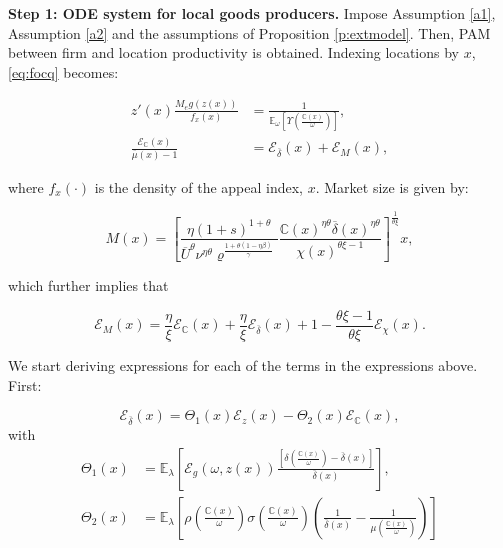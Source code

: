 \textbf{Step 1: ODE system for local goods producers.} Impose Assumption \ref{a1}, Assumption \ref{a2} and the assumptions of Proposition \ref{p:extmodel}. Then, PAM between firm and location productivity is obtained. Indexing locations by $x$, \eqref{eq:focq} becomes:

\begin{align}
	z'(x) \frac{M_e g(z(x))}{f_{x}(x)} & = \frac{1}{\mathbb{E}_{\omega}\left[\Upsilon\left(\frac{{\mathbb{C}(x)}}{\omega}\right) \right]}, \label{eq:focqx}  \\ 
    \frac{\mathcal{E}_\mathbb{C}(x)}{\overline{\mu}(x) - 1} & = \mathcal{E}_{\overline{\delta}}(x) +  \mathcal{E}_{M}(x), \label{eq:locfocx}
\end{align}

where $f_x(\cdot)$ is the density of the appeal index, $x$. Market size is given by:

\begin{equation*}
	M(x) = \left[\frac{\eta (1+s)^{1+\theta}}{\overline{U}^\theta {\nu}^{\eta \theta} \varrho^{\frac{1+\theta(1-\eta \beta)}{\gamma}}} \frac{{\mathbb{C}(x)}^{\eta \theta} \overline{\delta} \left(x\right)^{\eta \theta} }{ \chi\left(x\right)^{\theta\xi - 1}} \right]^{\frac{1}{\theta\xi}} x,
\end{equation*}

which further implies that

\begin{equation*}
	\mathcal{E}_{M}(x) = \frac{\eta}{\xi} \mathcal{E}_\mathbb{C}(x) +  \frac{\eta}{\xi} \mathcal{E}_{\overline{\delta}}(x) + 1 - \frac{\theta\xi - 1}{\theta\xi} \mathcal{E}_{\chi}(x).
\end{equation*}

We start deriving expressions for each of the terms in the expressions above. First:

\begin{equation*}
	\mathcal{E}_{\overline{\delta}}(x) = \Theta_1\left(x\right)\mathcal{E}_z(x) - \Theta_2 \left(x\right)\mathcal{E}_\mathbb{C}(x), 
\end{equation*}
with 
\begin{align*}
	\Theta_1(x) & = \mathbb{E}_\lambda \left[ \mathcal{E}_g(\omega, z(x)) \frac{\left[\delta\left(\frac{\mathbb{C}(x)}{\omega}\right) - \overline{\delta}(x)\right]}{\overline{\delta}(x)}\right],\\
    \Theta_2(x) & = \mathbb{E}_\lambda\left[\rho\left(\frac{\mathbb{C}(x)}{\omega}\right) \sigma\left(\frac{\mathbb{C}(x)}{\omega}\right)\left(\frac{1}{\overline{\delta}(x)} - \frac{1}{\mu\left(\frac{\mathbb{C}(x)}{\omega}\right)}\right)\right]
\end{align*}

